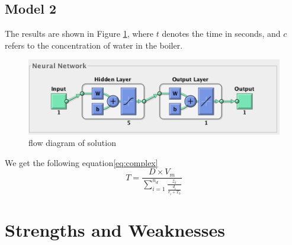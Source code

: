 \documentclass[12pt]{article}  %
\begin{document}
\subsection{Model 2}
The results are shown in Figure \ref{fig: flow diagram of solution}, where $t$ denotes the time in seconds, and $c$ refers to the concentration of water in the boiler.

\begin{figure}[htbp]
\centering
\includegraphics[width=.6\textwidth]{p1.png}
\caption{ flow diagram of solution}\label{fig: flow diagram of solution}
\end{figure}
We get the following equation\eqref{eq:complex}
\begin{equation}\label{eq:complex}
		T=\frac{D\times    V_m}{\sum_{i=1}^{n_d}{\frac{z_i}{\frac{d_i}{v_i+T_0}}}}
\end{equation}
\newpage
\section{Strengths and Weaknesses}
\end{document}
